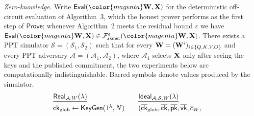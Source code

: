 \documentclass[sigconf,anonymous,review,balance=false]{acmart}
\newcommand{\rev}[1]{{\color{magenta}#1}}
\begin{document}
\begin{definition}
\noindent\emph{Zero-knowledge.}
Write $\mathsf{Eval}(\rev{\W}, \X)$ for the deterministic off-circuit evaluation of Algorithm~3, which the honest prover performs as the first step of $\mathsf{Prove}$; whenever Algorithm~2 meets the residual bound $\varepsilon$ we have $\mathsf{Eval}(\rev{\W}, \X) \in \mathcal{F}^{\varepsilon}_{\mathsf{zkdiet}}(\rev{\W}, \X)$. There exists a PPT simulator $\mathcal{S} = (\mathcal{S}_{1}, \mathcal{S}_{2})$ such that for every \rev{${\mathbf{W}} = ({\mathbf{W}}^{i})_{i \in \{Q, K, V, O\}}$} and every PPT adversary $\mathcal{A} = (\mathcal{A}_{1}, \mathcal{A}_{2})$, where $\mathcal{A}_{1}$ selects ${\mathbf{X}}$ only after seeing the keys and the published commitment, the two experiments below are computationally indistinguishable. Barred symbols denote values produced by the simulator.
\[
\begin{array}{@{}l@{\qquad}l@{}}
\underline{\mathsf{Real}_{\mathcal{A}, W}(\lambda)} &
\underline{\mathsf{Ideal}_{\mathcal{A}, \mathcal{S}, W}(\lambda)} \\[4pt]
\mathsf{ck}_{\mathrm{glob}} \leftarrow \mathsf{KeyGen}(1^{\lambda}, N) &
(\overline{\mathsf{ck}}_{\mathrm{glob}}, \overline{\mathsf{ck}},
 \overline{\mathsf{pk}}, \overline{\mathsf{vk}}, \overline{c}_{W},

\end{array}\]
\end{definition}
\end{document}
